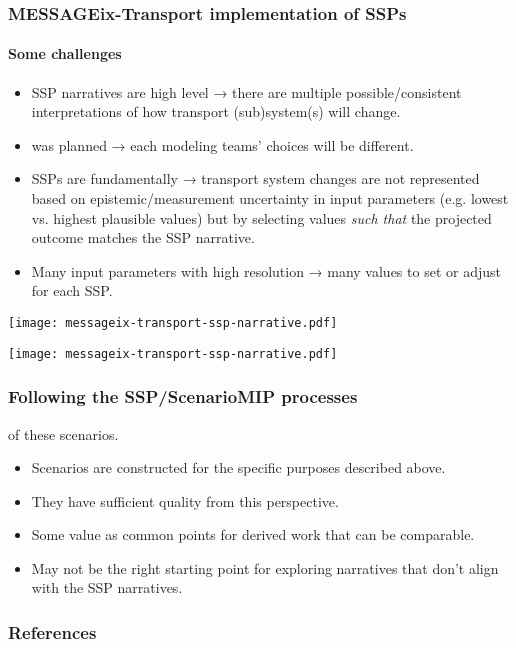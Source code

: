 \documentclass[12pt,aspectratio=169]{beamer}
\begin{document}
\begin{frame}
\frametitle{MESSAGEix-Transport implementation of SSPs}
\framesubtitle{Some challenges}

\begin{itemize}
  \item SSP narratives are high level → there are multiple possible/consistent interpretations of how transport (sub)system(s) will change.
  \item {} was planned → each modeling teams' choices will be different.
  \item SSPs are fundamentally  → transport system changes are not represented based on epistemic/measurement uncertainty in input parameters (e.g. lowest vs. highest plausible values) but by selecting values \emph{such that} the projected outcome matches the SSP narrative.
  \item Many input parameters with high resolution → many values to set or adjust for each SSP.
\end{itemize}
\end{frame}

\begin{frame}[plain]
\hspace*{-11mm}
\texttt{[image: messageix-transport-ssp-narrative.pdf]}
\end{frame}

\begin{frame}[plain]
\hspace*{-11mm}
\texttt{[image: messageix-transport-ssp-narrative.pdf]}
\end{frame}

\begin{frame}
\frametitle{Following the SSP/ScenarioMIP processes}

 of these scenarios.
\begin{itemize}
  \item Scenarios are constructed for the specific purposes described above.
  \item They have sufficient quality from this perspective.
  \item Some value as common points for derived work that can be comparable.
  \item May not be the right starting point for exploring narratives that don't align with the SSP narratives.
\end{itemize}
\end{frame}

\makefinalslide

\appendix

\begin{frame}[allowframebreaks]
\frametitle{References}

\printbibliography[heading=none]

\end{frame}
\end{document}
